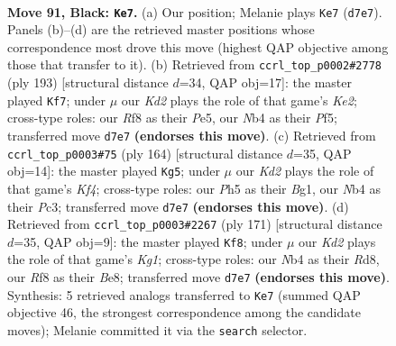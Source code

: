 \documentclass[11pt]{article}
\begin{document}
\clearpage

\begin{figure}[p]\centering
\begin{subfigure}{0.46\textwidth}\centering
\resizebox{\linewidth}{!}{%
\newchessgame
\chessboard[
  setfen={5r2/3k1p2/6p1/4P2p/bnB2Pp1/8/3N1K1P/8 b - - 41 91},
  showmover=false,
  pgfstyle=straightmove, color=movearrow, markmove={d7-e7}
]}
\caption{}
\end{subfigure}\hfill
\begin{subfigure}{0.46\textwidth}\centering
\resizebox{\linewidth}{!}{%
\newchessgame
\chessboard[
  setfen={B7/4k3/6p1/2p1pp1p/2P1p2P/6P1/3K4/8 b - - 77 97},
  showmover=false,
  pgfstyle=straightmove, color=movearrow, markmove={e7-f7}
]}
\caption{}
\end{subfigure}
\\[4pt]
\begin{subfigure}{0.46\textwidth}\centering
\resizebox{\linewidth}{!}{%
\newchessgame
\chessboard[
  setfen={8/5k1p/p1p4P/5P2/p1p2K2/2Pb4/1P6/6B1 w - - 66 83},
  showmover=false,
  pgfstyle=straightmove, color=movearrow, markmove={f4-g5}
]}
\caption{}
\end{subfigure}\hfill
\begin{subfigure}{0.46\textwidth}\centering
\resizebox{\linewidth}{!}{%
\newchessgame
\chessboard[
  setfen={3rb1k1/1R3p2/4pPpK/4P3/3p4/3B4/5P2/8 b - - 22 86},
  showmover=false,
  pgfstyle=straightmove, color=movearrow, markmove={g8-f8}
]}
\caption{}
\end{subfigure}
\caption{\textbf{Move 91, Black: \texttt{Ke7}.} (a) Our position; Melanie plays \texttt{Ke7} (\texttt{d7e7}). Panels (b)--(d) are the retrieved master positions whose correspondence most drove this move (highest QAP objective among those that transfer to it). (b) Retrieved from \texttt{ccrl\_top\_p0002\#2778} (ply 193) [structural distance $d$=34, QAP obj=17]: the master played \texttt{Kf7}; under $\mu$ our \emph{Kd2} plays the role of that game's \emph{Ke2}; cross-type roles: our \emph{R}f8 as their \emph{P}e5, our \emph{N}b4 as their \emph{P}f5; transferred move \texttt{d7e7} \textbf{(endorses this move)}. (c) Retrieved from \texttt{ccrl\_top\_p0003\#75} (ply 164) [structural distance $d$=35, QAP obj=14]: the master played \texttt{Kg5}; under $\mu$ our \emph{Kd2} plays the role of that game's \emph{Kf4}; cross-type roles: our \emph{P}h5 as their \emph{B}g1, our \emph{N}b4 as their \emph{P}c3; transferred move \texttt{d7e7} \textbf{(endorses this move)}. (d) Retrieved from \texttt{ccrl\_top\_p0003\#2267} (ply 171) [structural distance $d$=35, QAP obj=9]: the master played \texttt{Kf8}; under $\mu$ our \emph{Kd2} plays the role of that game's \emph{Kg1}; cross-type roles: our \emph{N}b4 as their \emph{R}d8, our \emph{R}f8 as their \emph{B}e8; transferred move \texttt{d7e7} \textbf{(endorses this move)}. Synthesis: 5 retrieved analogs transferred to \texttt{Ke7} (summed QAP objective 46, the strongest correspondence among the candidate moves); Melanie committed it via the \texttt{search} selector.}
\label{fig:thought-m181}
\end{figure}
\end{document}
